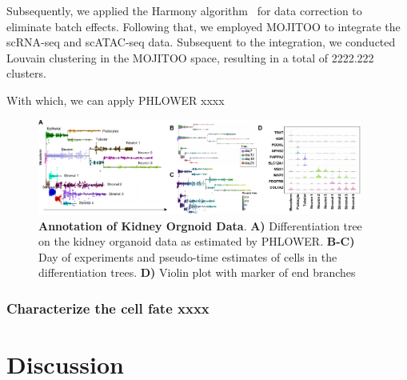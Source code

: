 
Subsequently, we applied the Harmony algorithm~\citep{Korsunsky2019harmony} for data correction to eliminate batch effects. Following that, we employed MOJITOO to integrate the scRNA-seq and scATAC-seq data. Subsequent to the integration, we conducted Louvain clustering in the MOJITOO space, resulting in a total of \num{2222,222} clusters.


With which, we can apply PHLOWER xxxx





\begin{figure}[!ht]
	\centering
	\includegraphics[width=0.95\textwidth]{kidney_main/fig}
	\vspace{0.1cm}
	\caption[Annotation of Kidney Orgnoid Data]{\textbf{Annotation of Kidney Orgnoid Data}. \textbf{A)} Differentiation tree on the kidney organoid data as estimated by PHLOWER. \textbf{B-C)} Day of experiments and pseudo-time estimates of cells in the differentiation trees. \textbf{D)} Violin plot with marker of end branches}
	\label{fig:kidney_organoid}
\end{figure}

\subsubsection{Characterize the cell fate xxxx}
\section{Discussion}

